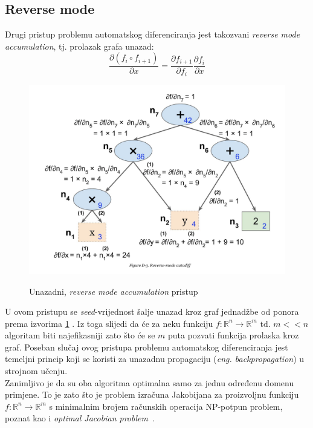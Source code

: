 \documentclass[zavrsnirad]{fer}
\begin{document}
\subsection{Reverse mode}
\label{pog:reverse}
Drugi pristup problemu automatskog diferenciranja jest takozvani \textit{reverse mode accumulation}, tj. prolazak grafa unazad:
\begin{equation}
  \frac{\partial (f_i \circ f_{i+1})}{\partial x} = \frac{\partial f_{i+1}}{\partial f_i} \frac{\partial f_i}{\partial x}
\end{equation}
\begin{figure}[h]
  \centering
  \includegraphics[width=0.7\linewidth]{"./slike/reverse_graph.png"}
  \caption{Unazadni, \textit{reverse mode accumulation} pristup}
  \cite{srijithr_gitlab}
  \label{slk:reverse_graf}
\end{figure}
U ovom pristupu se \textit{seed}-vrijednost šalje unazad kroz graf jednadžbe od ponora prema izvorima \ref{slk:reverse_graf} . Iz toga slijedi da će za neku funkciju $f\colon \mathbb{R}^n \rightarrow \mathbb{R}^m \text{ td. } m << n$ algoritam biti najefikasniji zato što će se $m$ puta pozvati funkcija prolaska kroz graf. Poseban slučaj ovog pristupa problemu automatskog diferenciranja jest temeljni princip koji se koristi za unazadnu propagaciju (\textit{eng. backpropagation}) u strojnom učenju.
\\
Zanimljivo je da su oba algoritma optimalna samo za jednu određenu domenu primjene. To je zato što je problem izračuna Jakobijana za proizvoljnu funkciju $f\colon \mathbb{R}^n \rightarrow \mathbb{R}^m$ s minimalnim brojem računskih operacija NP-potpun problem, poznat kao i \textit{optimal Jacobian problem}~\cite{naumann:optimaljacobian}.
\end{document}
